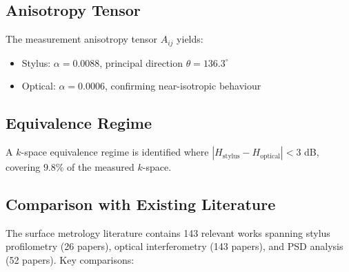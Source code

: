 \documentclass[review]{elsarticle}
\begin{document}
\subsection{Anisotropy Tensor}

The measurement anisotropy tensor $A_{ij}$ yields:
\begin{itemize}
    \item Stylus: $\alpha = 0.0088$, principal direction $\theta = 136.3^\circ$
    \item Optical: $\alpha = 0.0006$, confirming near-isotropic behaviour
\end{itemize}

\subsection{Equivalence Regime}

A $k$-space equivalence regime is identified where $|H_\mathrm{stylus} - H_\mathrm{optical}| < 3$ dB,
covering $9.8\%$ of the
measured $k$-space.


\subsection{Comparison with Existing Literature}

The surface metrology literature contains 143 relevant works spanning
stylus profilometry (26 papers), optical interferometry (143 papers),
and PSD analysis (52 papers). Key comparisons:
\end{document}
